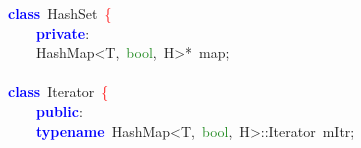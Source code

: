 \documentclass[table, usenames,dvipsnames,svgnames]{beamer}
\begin{document}
\begin{frame}
\pause
\vspace{-6mm}
\begin{center}\begin{minipage}{90mm}
\begin{block}
\noindent
\mbox{}\ \ \ \ \textbf{\textcolor{Blue}{class}}\ \textcolor{TealBlue}{HashSet}\ \textcolor{Red}{\{} \\
\mbox{}\ \ \ \ \ \ \ \ \textbf{\textcolor{Blue}{private}}\textcolor{BrickRed}{:} \\
\mbox{}\ \ \ \ \ \ \ \ HashMap\textcolor{BrickRed}{\textless{}}T\textcolor{BrickRed}{,}\ \textcolor{ForestGreen}{bool}\textcolor{BrickRed}{,}\ H\textcolor{BrickRed}{\textgreater{}*}\ map\textcolor{BrickRed}{;} \\
\mbox{} \\
\mbox{}\ \ \ \ \textbf{\textcolor{Blue}{class}}\ \textcolor{TealBlue}{Iterator}\ \textcolor{Red}{\{} \\
\mbox{}\ \ \ \ \ \ \ \ \textbf{\textcolor{Blue}{public}}\textcolor{BrickRed}{:} \\
\mbox{}\ \ \ \ \ \ \ \ \textbf{\textcolor{Blue}{typename}}\ \textcolor{TealBlue}{HashMap}\textcolor{BrickRed}{\textless{}}T\textcolor{BrickRed}{,}\ \textcolor{ForestGreen}{bool}\textcolor{BrickRed}{,}\ H\textcolor{BrickRed}{\textgreater{}::}\textcolor{TealBlue}{Iterator}\ mItr\textcolor{BrickRed}{;} 
\end{block}
\end{minipage}\end{center}

\end{frame}
\end{document}
